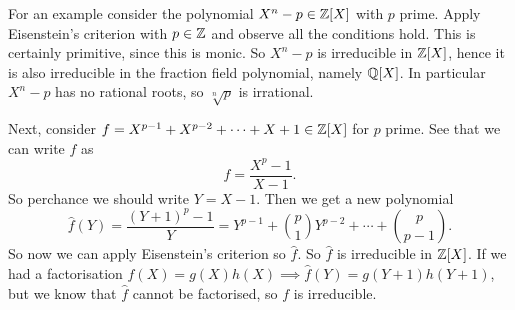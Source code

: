 \documentclass{article}
\begin{document}
For an example consider the polynomial $ X^n-p\in \mathbb{Z}[X] $ with $ p $ prime. Apply Eisenstein's criterion with $ p\in \mathbb{Z} $ and observe all the conditions hold. This is certainly primitive, since this is monic. So $ X^n-p $ is irreducible in $ \mathbb{Z}[X] $, hence it is also irreducible in the fraction field polynomial, namely $ \mathbb{Q}[X] $. In particular $ X^n-p $ has no rational roots, so $ \sqrt[n]{p} $ is irrational.\par
Next, consider $ f=X^{p-1}+X^{p-2}+\cdots + X + 1\in \mathbb{Z}[X] $ for $ p $ prime. See that we can write $ f $ as
\[
	f=\frac{X^p-1}{X-1}.
\]
So perchance we should write $ Y=X-1 $. Then we get a new polynomial
\[
	\hat f(Y)=\frac{(Y+1)^p-1}Y = Y^{p-1}+\binom p1Y^{p-2}+\cdots+\binom p{p-1}.
\]
So now we can apply Eisenstein's criterion so $ \hat f $. So $ \hat f $ is irreducible in $ \mathbb{Z}[X] $. If we had a factorisation $ f(X)=g(X)h(X)\implies \hat f(Y)=g(Y+1)h(Y+1) $, but we know that $ \hat f $ cannot be factorised, so $ f $ is irreducible.
\end{document}
